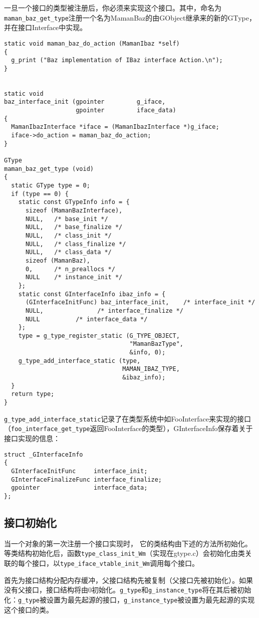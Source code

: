 一旦一个接口的类型被注册后，你必须来实现这个接口。其中，命名为\verb|maman_baz_get_type|注册一个名为MamanBaz的由GObject继承来的新的GType，并在接口Interface中实现。
\begin{verbatim}
static void maman_baz_do_action (MamanIbaz *self)
{
  g_print ("Baz implementation of IBaz interface Action.\n");
}


static void
baz_interface_init (gpointer         g_iface,
                    gpointer         iface_data)
{
  MamanIbazInterface *iface = (MamanIbazInterface *)g_iface;
  iface->do_action = maman_baz_do_action;
}

GType 
maman_baz_get_type (void)
{
  static GType type = 0;
  if (type == 0) {
    static const GTypeInfo info = {
      sizeof (MamanBazInterface),
      NULL,   /* base_init */
      NULL,   /* base_finalize */
      NULL,   /* class_init */
      NULL,   /* class_finalize */
      NULL,   /* class_data */
      sizeof (MamanBaz),
      0,      /* n_preallocs */
      NULL    /* instance_init */
    };
    static const GInterfaceInfo ibaz_info = {
      (GInterfaceInitFunc) baz_interface_init,    /* interface_init */
      NULL,               /* interface_finalize */
      NULL          /* interface_data */
    };
    type = g_type_register_static (G_TYPE_OBJECT,
                                   "MamanBazType",
                                   &info, 0);
    g_type_add_interface_static (type,
                                 MAMAN_IBAZ_TYPE,
                                 &ibaz_info);
  }
  return type;
}
\end{verbatim}
\verb|g_type_add_interface_static|记录了在类型系统中如FooInterface来实现的接口（\verb|foo_interface_get_type|返回FooInterface的类型），GInterfaceInfo保存着关于接口实现的信息：
\begin{verbatim}
struct _GInterfaceInfo
{
  GInterfaceInitFunc     interface_init;
  GInterfaceFinalizeFunc interface_finalize;
  gpointer               interface_data;
};
\end{verbatim}

\subsection{接口初始化}
当一个对象的第一次注册一个接口实现时， 它的类结构由下述的方法所初始化。等类结构初始化后，函数\verb|type_class_init_Wm|（实现在gtype.c）会初始化由类关联的每个接口，以\verb|type_iface_vtable_init_Wm|调用每个接口。

首先为接口结构分配内存缓冲，父接口结构先被复制（父接口先被初始化）。如果没有父接口，接口结构将由0初始化。\verb|g_type|和\verb|g_instance_type|将在其后被初始化：\verb|g_type|被设置为最先起源的接口，\verb|g_instance_type|被设置为最先起源的实现这个接口的类。


